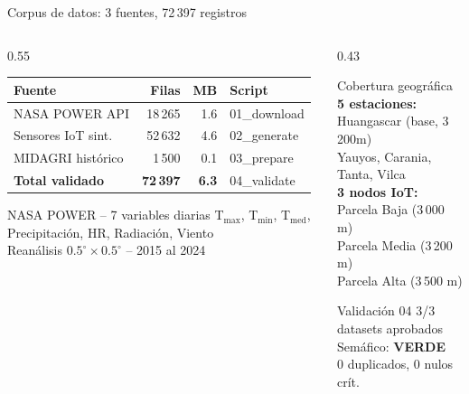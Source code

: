 \documentclass[14pt,aspectratio=169]{beamer}
\begin{document}
\begin{frame}{Corpus de datos: 3 fuentes, 72\,397 registros}
  \begin{columns}[T]
    \begin{column}{0.55\textwidth}
      \begin{tabular}{lrrl}
        \toprule
        \textbf{Fuente} & \textbf{Filas} & \textbf{MB} & \textbf{Script} \\
        \midrule
        NASA POWER API & 18\,265 & 1.6 & 01\_download \\
        Sensores IoT sint. & 52\,632 & 4.6 & 02\_generate \\
        MIDAGRI hist\'orico & 1\,500 & 0.1 & 03\_prepare \\
        \midrule
        \rowcolor{agroclear!50}
        \textbf{Total validado} & \textbf{72\,397} & \textbf{6.3} & 04\_validate \\
        \bottomrule
      \end{tabular}

      \vspace{0.5em}
      \begin{block}{NASA POWER -- 7 variables diarias}
        \footnotesize
        T$_{\max}$, T$_{\min}$, T$_{\text{med}}$,
        Precipitaci\'on, HR, Radiaci\'on, Viento\\
        Rean\'alisis $0.5^{\circ}\times0.5^{\circ}$ -- 2015 al 2024
      \end{block}
    \end{column}
    \begin{column}{0.43\textwidth}
      \begin{exampleblock}{Cobertura geogr\'afica}
        \footnotesize
        \textbf{5 estaciones:}\\
        Huangascar (base, 3\,200m)\\
        Yauyos, Carania, Tanta, Vilca\\[0.3em]
        \textbf{3 nodos IoT:}\\
        Parcela Baja (3\,000 m)\\
        Parcela Media (3\,200 m)\\
        Parcela Alta (3\,500 m)
      \end{exampleblock}
      \vspace{0.3em}
      \begin{alertblock}{Validaci\'on 04}
        \footnotesize
        3/3 datasets aprobados\\
        Sem\'afico: \textbf{VERDE}\\
        0 duplicados, 0 nulos cr\'it.
      \end{alertblock}
    \end{column}
  \end{columns}
\end{frame}
\end{document}
